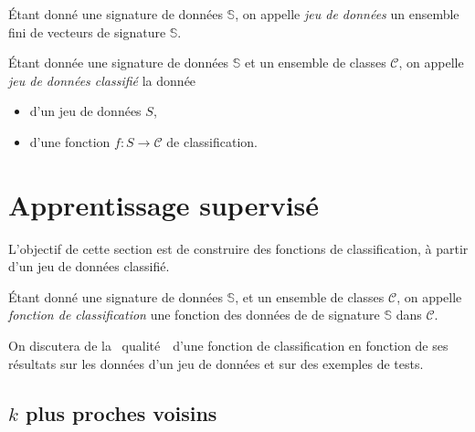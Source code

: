 \begin{defn}
	Étant donné une signature de données $\mathds{S}$, on appelle {\it jeu de données}\/ un ensemble fini de vecteurs de signature $\mathds{S}$.
\end{defn}

\begin{defn}
	Étant donnée une signature de données $\mathds{S}$\/ et un ensemble de classes $\mathcal{C}$, on appelle {\it jeu de données classifié}\/ la donnée
	\begin{itemize}
		\item d'un jeu de données $S$,
		\item d'une fonction $f: S \to \mathcal{C}$\/ de classification.
	\end{itemize}
\end{defn}

\begin{comment}
On distingue deux méthodes d'apprentissage :
\begin{enumerate}
	\item l'apprentissage supervisé où l'algorithme tente de classifier et est corrigé
	\item l'apprentissage non supervisé où l'algorithme 
\end{enumerate}
\end{comment}

\section{Apprentissage supervisé}

L'objectif de cette section est de construire des fonctions de classification, à partir d'un jeu de données classifié.

\begin{defn}
	Étant donné une signature de données $\mathds{S}$, et un ensemble de classes $\mathcal{C}$, on appelle {\it fonction de classification}\/ une fonction des données de de signature $\mathds{S}$\/ dans $\mathcal{C}$.
\end{defn}

\begin{rmk}
	On discutera de la \guillemotleft~qualité~\guillemotright\ d'une fonction de classification en fonction de ses résultats sur les données d'un jeu de données et sur des exemples de tests.
\end{rmk}

\subsection{$k$\/ plus proches voisins}

